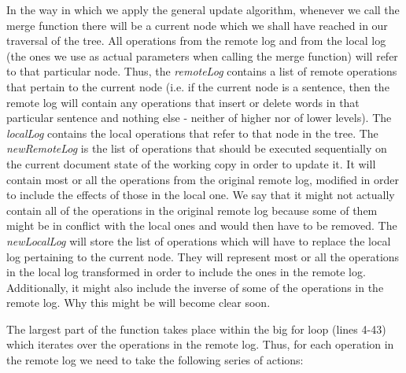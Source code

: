 In the way in which we apply the general update algorithm, whenever we call the merge function there
will be a current node which we shall have reached in our traversal of the tree. All operations from the
remote log and from the local log (the ones we use as actual parameters when calling the merge function)
will refer to that particular node. Thus, the \emph{remoteLog} contains a list of remote operations
that pertain to the current node (i.e. if the current node is a sentence, then the remote log will
contain any operations that insert or delete words in that particular sentence and nothing else -
neither of higher nor of lower levels). The \emph{localLog} contains the local operations that refer
to that node in the tree. The \emph{newRemoteLog} is the list of operations that should be executed
sequentially on the current document state of the working copy in order to update it. It will contain
most or all the operations from the original remote log, modified in order to include the effects of
those in the local one. We say that it might not actually contain all of the operations in the
original remote log because some of them might be in conflict with the local ones and would then
have to be removed. The \emph{newLocalLog} will store the list of operations which will have to replace
the local log pertaining to the current node. They will represent most or all the operations in the
local log transformed in order to include the ones in the remote log. Additionally, it might also
include the inverse of some of the operations in the remote log. Why this might be will become clear
soon.

The largest part of the function takes place within the big for loop (lines 4-43) which iterates over
the operations in the remote log. Thus, for each operation in the remote log we need to take the following
series of actions:

